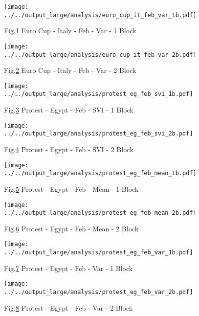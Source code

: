 \documentclass[a4paper,12pt]{article}
\begin{document}
\begin{figure}[h!]
\caption{Fig.\ref{fig:fig5} Euro Cup - Italy - Feb - Var - 1 Block }
\texttt{[image: ../../output\_large/analysis/euro\_cup\_it\_feb\_var\_1b.pdf]}
\label{fig:fig5}
\end{figure}

\begin{figure}[h!]
\caption{Fig.\ref{fig:fig6} Euro Cup - Italy - Feb - Var - 2 Block }
\texttt{[image: ../../output\_large/analysis/euro\_cup\_it\_feb\_var\_2b.pdf]}
\label{fig:fig6}
\end{figure}


\begin{figure}[h!]
\caption{Fig.\ref{fig:fig7} Protest - Egypt - Feb - SVI - 1 Block }
\texttt{[image: ../../output\_large/analysis/protest\_eg\_feb\_svi\_1b.pdf]}
\label{fig:fig7}
\end{figure}

\begin{figure}[h!]
\caption{Fig.\ref{fig:fig8} Protest - Egypt - Feb - SVI - 2 Block }
\texttt{[image: ../../output\_large/analysis/protest\_eg\_feb\_svi\_2b.pdf]}
\label{fig:fig8}
\end{figure}

\begin{figure}[h!]
\caption{Fig.\ref{fig:fig9} Protest - Egypt - Feb - Mean - 1 Block }
\texttt{[image: ../../output\_large/analysis/protest\_eg\_feb\_mean\_1b.pdf]}
\label{fig:fig9}
\end{figure}

\begin{figure}[h!]
\caption{Fig.\ref{fig:fig10} Protest - Egypt - Feb - Mean - 2 Block }
\texttt{[image: ../../output\_large/analysis/protest\_eg\_feb\_mean\_2b.pdf]}
\label{fig:fig10}
\end{figure}

\begin{figure}[h!]
\caption{Fig.\ref{fig:fig11} Protest - Egypt - Feb - Var - 1 Block }
\texttt{[image: ../../output\_large/analysis/protest\_eg\_feb\_var\_1b.pdf]}
\label{fig:fig11}
\end{figure}

\begin{figure}[h!]
\caption{Fig.\ref{fig:fig12} Protest - Egypt - Feb - Var - 2 Block }
\texttt{[image: ../../output\_large/analysis/protest\_eg\_feb\_var\_2b.pdf]}
\label{fig:fig12}
\end{figure}
\end{document}
